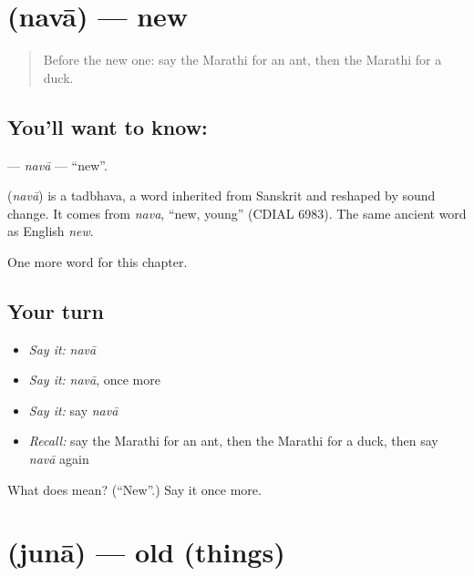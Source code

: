 \section[\texorpdfstring{\mr{नवा} (navā)}{नवा (navā)}]{ (navā) — new}

\label{lesson:MR-C103-nava}



\begin{quote}
Before the new one: say the Marathi for an ant, then the Marathi for a duck.
\end{quote}

\subsection*{You'll want to know: }
\textbf{} — \emph{navā} — \textquotedblleft{}new\textquotedblright{}.

\begin{cousinweb}
\textbf{} (\emph{navā}) is a tadbhava, a word inherited from Sanskrit and reshaped by sound change. It comes from \emph{nava}, \textquotedblleft{}new, young\textquotedblright{} (CDIAL 6983). The same ancient word as English \emph{new}.
\end{cousinweb}

\begin{grammarlens}[title={What you've built}]
One more word for this chapter.
\end{grammarlens}

\subsection*{Your turn}
\begin{itemize}
\raggedright
  \item \emph{Say it:} \emph{navā}
  \item \emph{Say it:} \emph{navā}, once more
  \item \emph{Say it:} say \emph{navā}
  \item \emph{Recall:} say the Marathi for an ant, then the Marathi for a duck, then say \emph{navā} again
\end{itemize}

\begin{tcolorbox}[breakable,colback=teal!4,colframe=teal!35!black,title={Before you move on}]
What does  mean? (\textquotedblleft{}New\textquotedblright{}.) Say it once more.
\end{tcolorbox}
\section[\texorpdfstring{\mr{जुना} (junā)}{जुना (junā)}]{ (junā) — old (things)}

